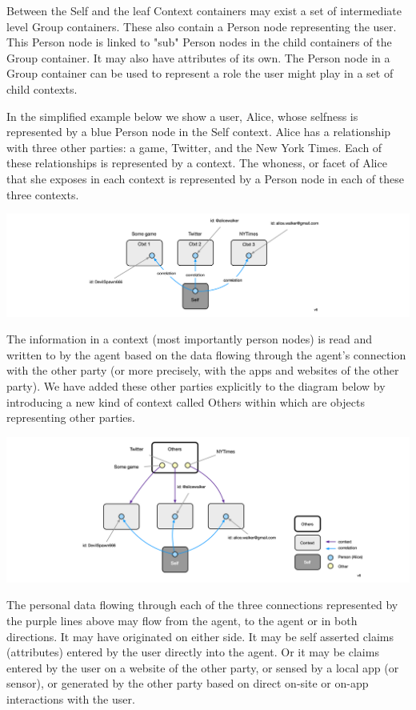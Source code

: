 \documentclass[11pt, oneside]{article}   	%
\begin{document}
Between the Self and the leaf Context containers may exist a set of intermediate level Group containers. These also contain a Person node representing the user. This Person node is linked to "sub" Person nodes in the child containers of the Group container. It may also have attributes of its own. The Person node in a Group container can be used to represent a role the user might play in a set of child contexts. 

In the simplified example below we show a user, Alice, whose selfness is represented by a blue Person node in the Self context. Alice has a relationship with three other parties: a game, Twitter, and the New York Times. Each of these relationships is represented by a context. The whoness, or facet of Alice that she exposes in each context is represented by a Person node in each of these three contexts.

\includegraphics[width=\textwidth]{./images/example1.png}

The information in a context (most importantly person nodes) is read and written to by the agent based on the data flowing through the agent's connection with the other party (or more precisely, with the apps and websites of the other party). We have added these other parties explicitly to the diagram below by introducing a new kind of context called Others within which are objects representing other parties. 

\includegraphics[width=\textwidth]{./images/example2.png}

The personal data flowing through each of the three connections represented by the purple lines above may flow from the agent, to the agent or in both directions. It may have originated on either side. It may be self asserted claims (attributes) entered by the user directly into the agent. Or it may be claims entered by the user on a website of the other party, or sensed by a local app (or sensor), or generated by the other party based on direct on-site or on-app interactions with the user.
\end{document}
